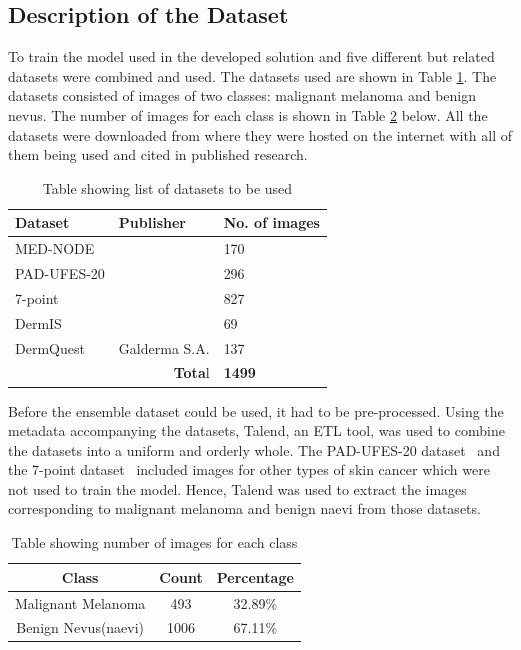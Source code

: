 \documentclass[12pt, a4paper]{article}
\begin{document}
\subsection{Description of the Dataset}
To train the model used in the developed solution and five different but related datasets were combined and used. The datasets used are shown in Table \ref{tab:datasets2}. The datasets consisted of images of two classes: malignant melanoma and benign nevus. The number of images for each class is shown in Table \ref{tab:class_img_count} below. All the datasets were downloaded from where they were hosted on the internet with all of them being used and cited in published research.
\begin{table}[h]
    \centering
    \begin{tabular}{|l|l|l|}
    \hline
    \textbf{Dataset} & \textbf{Publisher} & \textbf{No. of images}\\\hline
    MED-NODE & \cite{giotis2015med} & 170\\\hline
    PAD-UFES-20 & \cite{PACHECO2020103545} & 296\\\hline
    7-point & \cite{8333693} & 827\\\hline
    DermIS & \cite{dermis} & 69\\\hline
    DermQuest & Galderma S.A. & 137\\\hline
    \multicolumn{2}{|r|}{\textbf{Tota}l} & \textbf{1499}\\\hline
    \end{tabular}
    \caption{Table showing list of datasets to be used}
    \label{tab:datasets2}
\end{table}

Before the ensemble dataset could be used, it had to be pre-processed. Using the metadata accompanying the datasets, Talend, an ETL tool, was used to combine the datasets into a uniform and orderly whole. The PAD-UFES-20 dataset~\citep{PACHECO2020103545} and the 7-point dataset~\citep{8333693} included images for other types of skin cancer which were not used to train the model. Hence, Talend was used to extract the images corresponding to malignant melanoma and benign naevi from those datasets.

\begin{table}[h]
    \centering
    \begin{tabular}{|c|c|c|}
        \hline
        \textbf{Class} & \textbf{Count} & \textbf{Percentage}\\\hline
        Malignant Melanoma & 493 & 32.89\%\\\hline
        Benign Nevus(naevi) & 1006 & 67.11\%\\\hline
    \end{tabular}
    \caption{Table showing number of images for each class}
    \label{tab:class_img_count}
\end{table}
\end{document}
